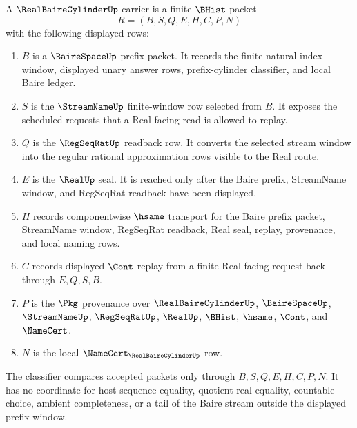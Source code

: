 \begin{definition}\label{def:real-baire-cylinder-carrier}
A $\RealBaireCylinderUp$ carrier is a finite $\BHist$ packet
$$
R=(B,S,Q,E,H,C,P,N)
$$
with the following displayed rows:
\begin{enumerate}
\item $B$ is a $\BaireSpaceUp$ prefix packet. It records the finite natural-index window, displayed unary answer rows, prefix-cylinder classifier, and local Baire ledger.
\item $S$ is the $\StreamNameUp$ finite-window row selected from $B$. It exposes the scheduled requests that a Real-facing read is allowed to replay.
\item $Q$ is the $\RegSeqRatUp$ readback row. It converts the selected stream window into the regular rational approximation rows visible to the Real route.
\item $E$ is the $\RealUp$ seal. It is reached only after the Baire prefix, StreamName window, and RegSeqRat readback have been displayed.
\item $H$ records componentwise $\hsame$ transport for the Baire prefix packet, StreamName window, RegSeqRat readback, Real seal, replay, provenance, and local naming rows.
\item $C$ records displayed $\Cont$ replay from a finite Real-facing request back through $E,Q,S,B$.
\item $P$ is the $\Pkg$ provenance over $\RealBaireCylinderUp$, $\BaireSpaceUp$, $\StreamNameUp$, $\RegSeqRatUp$, $\RealUp$, $\BHist$, $\hsame$, $\Cont$, and $\NameCert$.
\item $N$ is the local $\NameCert_{\RealBaireCylinderUp}$ row.
\end{enumerate}
The classifier compares accepted packets only through $B,S,Q,E,H,C,P,N$. It has no coordinate for host sequence equality, quotient real equality, countable choice, ambient completeness, or a tail of the Baire stream outside the displayed prefix window.
\end{definition}

